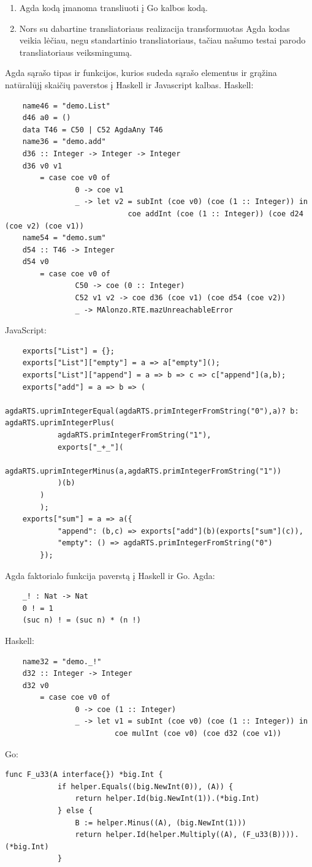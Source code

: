 \documentclass{VUMIFPSkursinis}
\begin{document}
\begin{enumerate}[noitemsep]
  \item Agda kodą įmanoma transliuoti į Go kalbos kodą.
  \item Nors su dabartine transliatoriaus realizacija transformuotas Agda kodas veikia lėčiau, negu standartinio transliatoriaus, tačiau našumo testai parodo transliatoriaus veiksmingumą.
\end{enumerate}

\printbibliography[heading=bibintoc] 

	\label{sec:priedas1}
	Agda sąrašo tipas ir funkcijos, kurios sudeda sąrašo elementus ir grąžina natūralūjį skaičių paverstos į Haskell ir Javascript kalbas. \newline
	Haskell:
	\begin{lstlisting}
	name46 = "demo.List"
	d46 a0 = ()
	data T46 = C50 | C52 AgdaAny T46	
	name36 = "demo.add"
	d36 :: Integer -> Integer -> Integer
	d36 v0 v1
		= case coe v0 of
				0 -> coe v1
				_ -> let v2 = subInt (coe v0) (coe (1 :: Integer)) in
							coe addInt (coe (1 :: Integer)) (coe d24 (coe v2) (coe v1))
	name54 = "demo.sum"
	d54 :: T46 -> Integer
	d54 v0
		= case coe v0 of
				C50 -> coe (0 :: Integer)
				C52 v1 v2 -> coe d36 (coe v1) (coe d54 (coe v2))
				_ -> MAlonzo.RTE.mazUnreachableError
		\end{lstlisting}
	JavaScript:
	\begin{lstlisting}
	exports["List"] = {};
	exports["List"]["empty"] = a => a["empty"]();
	exports["List"]["append"] = a => b => c => c["append"](a,b);
	exports["add"] = a => b => (
		agdaRTS.uprimIntegerEqual(agdaRTS.primIntegerFromString("0"),a)? b: agdaRTS.uprimIntegerPlus(
			agdaRTS.primIntegerFromString("1"),
			exports["_+_"](
				agdaRTS.uprimIntegerMinus(a,agdaRTS.primIntegerFromString("1"))
			)(b)
		)
		);
	exports["sum"] = a => a({
			"append": (b,c) => exports["add"](b)(exports["sum"](c)),
			"empty": () => agdaRTS.primIntegerFromString("0")
		});
		\end{lstlisting}	

\label{sec:priedas2}
Agda faktorialo funkcija paverstą į Haskell ir Go. \newline
Agda:
\begin{lstlisting}
	_! : Nat -> Nat
	0 ! = 1
	(suc n) ! = (suc n) * (n !)
	\end{lstlisting}
Haskell:
\begin{lstlisting}
	name32 = "demo._!"
	d32 :: Integer -> Integer
	d32 v0
		= case coe v0 of
				0 -> coe (1 :: Integer)
				_ -> let v1 = subInt (coe v0) (coe (1 :: Integer)) in
						 coe mulInt (coe v0) (coe d32 (coe v1))
	\end{lstlisting}
Go:
	\begin{lstlisting}[language=GoCust]
		func F_u33(A interface{}) *big.Int {
			if helper.Equals((big.NewInt(0)), (A)) {
				return helper.Id(big.NewInt(1)).(*big.Int)
			} else {
				B := helper.Minus((A), (big.NewInt(1)))
				return helper.Id(helper.Multiply((A), (F_u33(B)))).(*big.Int)
			}
	\end{lstlisting}
\end{document}
